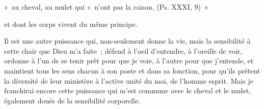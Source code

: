 \documentclass[french,twoside]{book} %
\newenvironment{quoteblock}%
  {\begin{quoting}}
  {\end{quoting}}
\newenvironment{quotebar}{%
    \def\FrameCommand{{\color{rubric!10!}\vrule width 0.5em} \hspace{0.9em}}%
    \def\OuterFrameSep{\itemsep} %
    \MakeFramed {\advance\hsize-\width \FrameRestore}
  }%
  {%
    \endMakeFramed
  }
\renewenvironment{quoteblock}%
  {%
    \savenotes
    \setstretch{0.9}
    \normalfont
    \begin{quotebar}
  }
  {%
    \end{quotebar}
    \spewnotes
  }
\begin{document}
\begin{quoteblock}
\noindent « au cheval, au mulet qui « n’ont pas la raison, (Ps. XXXI, 9) »\end{quoteblock}

\noindent et dont les corps vivent du même principe.\par
Il est une autre puissance qui, non-seulement donne la vie, mais la sensibilité à cette chair que Dieu m’a faite ; défend à l’oeil d’entendre, à l’oreille de voir, ordonne à l’un de se tenir prêt pour que je voie, à l’autre pour que j’entende, et maintient tous les sens chacun à son poste et dans sa fonction, pour qu’ils prêtent la diversité de leur ministère à l’active unité du moi, de l’homme esprit. Mais je franchirai encore cette puissance qui m’est commune avec le cheval et le mulet, également doués de la sensibilité corporelle.
\end{document}
